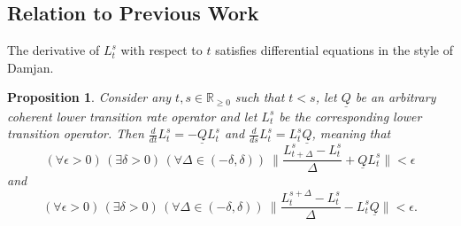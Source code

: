 \documentclass[10pt]{paper}
\newtheorem{proposition}[theorem]{Proposition}
\newcommand{\reals}{\mathbb{R}}
\newcommand{\realsnonneg}{\reals_{\geq 0}}
\newcommand{\lbound}{L}
\newcommand{\lrate}{\underline{Q}}
\begin{document}
\subsection{Relation to Previous Work}

The derivative of $\lbound_t^s$ with respect to $t$ satisfies differential equations in the style of Damjan.

\begin{proposition}
Consider any $t,s\in\realsnonneg$ such that $t<s$, let $\lrate$ be an arbitrary coherent lower transition rate operator and let $\lbound_t^s$ be the corresponding lower transition operator. Then $\frac{d}{dt}\lbound_t^s=-\lrate\lbound_t^s$ and $\frac{d}{ds}\lbound_t^s=\lbound_t^s\lrate$, meaning that
\begin{equation*}
(\forall\epsilon>0)\,
(\exists\delta>0)\,
(\forall\Delta\in(-\delta,\delta))~
\Big\lVert\frac{L_{t+\Delta}^s-L_t^s}{\Delta}+\lrate L_t^s\Big\rVert<\epsilon
\end{equation*}
and
\begin{equation*}
(\forall\epsilon>0)\,
(\exists\delta>0)\,
(\forall\Delta\in(-\delta,\delta))~
\Big\lVert\frac{L_{t}^{s+\Delta}-L_t^s}{\Delta}-\lbound_t^s\lrate \Big\rVert<\epsilon.
\end{equation*}
\end{proposition}
\end{document}
